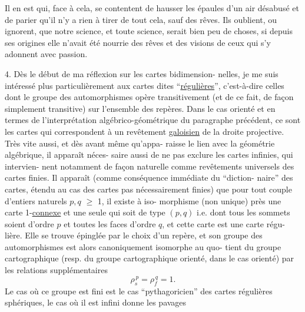 
Il en est qui, face à cela, se contentent de hausser les
épaules d'un air  désabusé et de parier qu'il n'y a rien à tirer
de tout cela, sauf des rêves. Ils oublient, ou ignorent, que notre
science, et toute science, serait bien peu  de choses, si depuis
ses origines elle n'avait été nourrie des rêves et des visions
de ceux qui s'y adonnent avec passion.

4.        Dès le début de ma réflexion sur les cartes bidimension-%
nelles, je me suis intéressé plus particulièrement aux cartes dites
``\uline{régulières}'', c'est-à-dire celles dont le groupe des automorphismes
opère transitivement (et de ce fait, de façon simplement transitive)
sur l'ensemble des repères. Dans le cas orienté et en termes de
l'interprétation algébrico-géométrique du paragraphe précédent,
ce sont les cartes qui correspondent à un revêtement \uline{galoisien} de
la droite projective. Très vite aussi, et dès avant même qu'appa-%
raisse le lien avec la géométrie algébrique, il apparaît néces-%
saire aussi de ne pas exclure les cartes infinies, qui intervien-%
nent notamment de façon naturelle comme revêtements universels des
cartes finies. Il apparaît (comme conséquence immédiate du ``diction-%
naire'' des cartes, étendu au cas des cartes pas nécessairement finies)
que pour tout couple d'entiers naturels  $p, q$ $\geq$ 1, il existe à iso-%
morphisme (non unique) près une carte 1-\uline{connexe} et une seule qui
soit de type  $(p,q)$  i.e. dont tous les sommets soient d'ordre  $p$
et toutes les faces d'ordre  $q$, et cette carte est une carte régu-%
lière. Elle se trouve épinglée par le choix d'un repère, et son
groupe des automorphismes est alors canoniquement isomorphe au quo-%
tient du groupe cartographique (resp. du groupe cartographique
orienté, dans le cas orienté) par les relations supplémentaires
\[ \rho_s^{\,p} = \rho_f^{\,q} = 1. \]
Le cas où ce groupe est fini est le cas ``pythagoricien'' des cartes
régulières sphériques, le cas où il est infini donne les pavages

